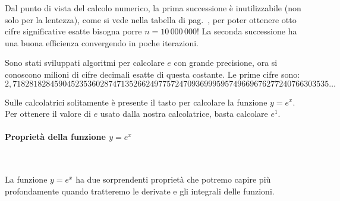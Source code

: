 Dal punto di vista del calcolo numerico, la prima successione è 
inutilizzabile (non solo per la lentezza), come si vede nella  
tabella di pag.~\pageref{tab:e},  per poter ottenere otto cifre 
significative esatte bisogna porre \(n = 10\,000\,000\)!
La seconda successione ha una buona efficienza convergendo in poche iterazioni.

Sono stati sviluppati algoritmi per calcolare \(e\) con grande precisione, 
ora si conoscono milioni di cifre decimali esatte di questa costante.
Le prime cifre sono:
\[2,71828182845904523536028747135266249775724709369995957
49669676277240766303535\dots\]

Sulle calcolatrici solitamente è presente il tasto per calcolare la 
funzione \(y = e^x\). Per ottenere il valore di \(e\) usato dalla nostra 
calcolatrice, basta calcolare \(e^1\).

\paragraph{Proprietà della funzione \(y=e^x\)}
~
\nopagebreak

La funzione \(y=e^x\) ha due sorprendenti proprietà che potremo capire più 
profondamente quando tratteremo le derivate e gli integrali delle funzioni.

